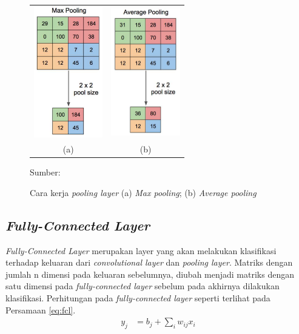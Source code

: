     \begin{figure}[H]
        \centering
        \begin{tabular}{cc}
            \includegraphics[width=3cm]{../img/CNN Max Pooling - Latex.PNG}
            &
            \includegraphics[width=3cm]{../img/CNN Average Pooling - Latex.PNG}\\
            (a) &(b)\\
        \end{tabular}
        \caption{Cara kerja \textit{pooling layer} (a) \textit{Max pooling}; (b) \textit{Average pooling}}
        \label{fig:pooling}
        Sumber: \citep{Yani2019}
    \end{figure}

    \subsection{\textit{Fully-Connected Layer}}
    \textit{Fully-Connected Layer} merupakan layer yang akan melakukan klasifikasi terhadap keluaran dari \textit{convolutional layer} dan \textit{pooling layer}. Matriks dengan jumlah n dimensi pada keluaran sebelumnya, diubah menjadi matriks dengan satu dimensi pada \textit{fully-connected layer} sebelum pada akhirnya dilakukan klasifikasi. Perhitungan pada \textit{fully-connected layer} seperti terlihat pada Persamaan \ref{eq:fcl}.
    \begin{align}
        y_j &= b_j + \sum_{i} w_{ij}x_i
        \label{eq:fcl}
    \end{align}

